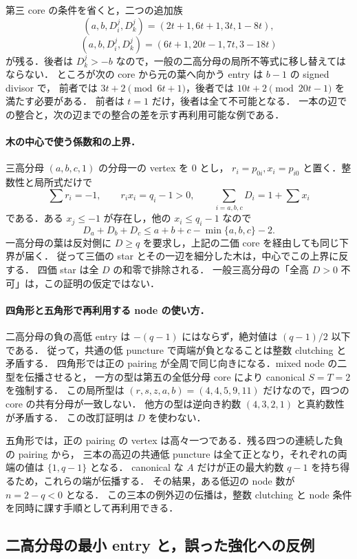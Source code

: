 第三 core の条件を省くと，二つの追加族
\[
 (a,b,D^j_i,D^j_k)=(2t+1,6t+1,3t,1-8t),
\]
\[
 (a,b,D^j_i,D^j_k)=(6t+1,20t-1,7t,3-18t)
\]
が残る．後者は $D^j_k>-b$ なので，一般の二高分母の局所不等式に移し替えてはならない．
ところが次の core から元の葉へ向かう entry は $b-1$ の signed divisor で，
前者では $3t+2\pmod{6t+1}$，後者では $10t+2\pmod{20t-1}$ を満たす必要がある．
前者は $t=1$ だけ，後者は全て不可能となる．
一本の辺での整合と，次の辺までの整合の差を示す再利用可能な例である．

\paragraph{木の中心で使う係数和の上界．}
三高分母 $(a,b,c,1)$ の分母一の vertex を $0$ とし，
$r_i=p_{0i},x_i=p_{i0}$ と置く．整数性と局所式だけで
\[
 \sum r_i=-1,\qquad r_ix_i=q_i-1>0,\qquad
 \sum_{i=a,b,c}D_i=1+\sum x_i
\]
である．ある $x_j\leq-1$ が存在し，他の $x_i\leq q_i-1$ なので
\[
 D_a+D_b+D_c\leq a+b+c-\min\{a,b,c\}-2.
\]
一高分母の葉は反対側に $D\geq q$ を要求し，上記の二価 core を経由しても同じ下界が届く．
従って三価の star とその一辺を細分した木は，中心でこの上界に反する．
四価 star は全 $D$ の和零で排除される．
一般三高分母の「全高 $D>0$ 不可」は，この証明の仮定ではない．

\paragraph{四角形と五角形で再利用する node の使い方．}
二高分母の負の高低 entry は $-(q-1)$ にはならず，絶対値は $(q-1)/2$ 以下である．
従って，共通の低 puncture で両端が負となることは整数 clutching と矛盾する．
四角形では正の pairing が全周で同じ向きになる．mixed node の二型を伝播させると，
一方の型は第五の全低分母 core により canonical $S=T=2$ を強制する．
この局所型は $(r,s,z,a,b)=(4,4,5,9,11)$ だけなので，四つの core の共有分母が一致しない．
他方の型は逆向き約数 $(4,3,2,1)$ と真約数性が矛盾する．
この改訂証明は $D$ を使わない．

五角形では，正の pairing の vertex は高々一つである．残る四つの連続した負の pairing から，
三本の高辺の共通低 puncture は全て正となり，それぞれの両端の値は $\{1,q-1\}$ となる．
canonical な $A$ だけが正の最大約数 $q-1$ を持ち得るため，これらの端が伝播する．
その結果，ある低辺の node 数が $n=2-q<0$ となる．
この三本の例外辺の伝播は，整数 clutching と node 条件を同時に課す手順として再利用できる．

\subsection{二高分母の最小 entry と，誤った強化への反例}

